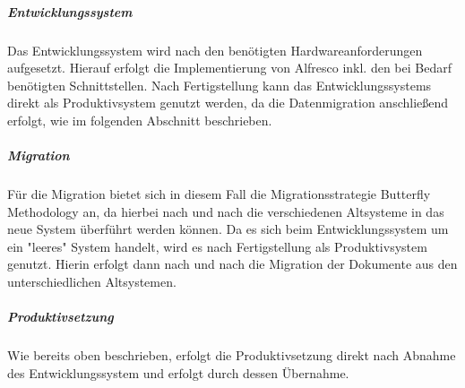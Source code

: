 \subparagraph{Entwicklungssystem}
Das Entwicklungssystem wird nach den benötigten Hardwareanforderungen aufgesetzt. Hierauf erfolgt die Implementierung von Alfresco inkl. den bei Bedarf benötigten Schnittstellen. Nach Fertigstellung kann das Entwicklungssystems direkt als Produktivsystem genutzt werden, da die Datenmigration anschließend erfolgt, wie im folgenden Abschnitt beschrieben.

\subparagraph{Migration}
Für die Migration bietet sich in diesem Fall die Migrationsstrategie Butterfly Methodology an, da hierbei nach und nach die verschiedenen Altsysteme in das neue System überführt werden können. Da es sich beim Entwicklungssystem um ein "leeres" System handelt, wird es nach Fertigstellung als Produktivsystem genutzt. Hierin erfolgt dann nach und nach die Migration der Dokumente aus den unterschiedlichen Altsystemen.

\subparagraph{Produktivsetzung}
Wie bereits oben beschrieben, erfolgt die Produktivsetzung direkt nach Abnahme des Entwicklungssystem und erfolgt durch dessen Übernahme.

